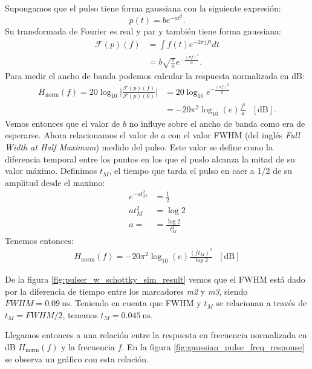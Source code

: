 Supongamos que el pulso tiene forma gaussiana con la siguiente expresión:
\begin{equation}
\label{eq:gaussian_pulse}
p(t) = b e^{-a t^2}.
\end{equation}
Su transformada de Fourier es real y par y también tiene forma gaussiana:
\begin{align}
    \mathcal{F}(p)(f) &= \int f(t) e^{-2\pi j f t} dt\\
    &= b\sqrt{\frac{\pi}{a}} e^{-\frac{(\pi f)^2}{a}}.
\end{align}
Para medir el ancho de banda podemos calcular la respuesta normalizada en dB:
\begin{align}
    H_{\text{norm}}(f) = 20 \log_{10} \bigg| \frac{\mathcal{F}(p)(f)}{\mathcal{F}(p)(0)}\bigg|  & = 20 \log_{10} e^{-\frac{(\pi f)^2}{a}}\\
 &= -20 \pi^2 \log_{10}(e) \frac{f^2}{a} \ \ \ [\text{dB}].
\end{align}
Vemos entonces que el valor de $b$ no influye sobre el ancho de banda como era
de esperarse. Ahora relacionamos el valor de $a$ con el valor FWHM (del inglés
\textit{Full Width at Half Maximum}) medido del pulso. Este valor se define como
la diferencia temporal entre los puntos en los que el puslo alcanza la mitad de
su valor máximo. Definimos $t_M$, el tiempo que tarda el pulso en caer a 1/2 de
su amplitud desde el maximo:
\begin{align}
    e^{-a t_M^2} &= \frac{1}{2}\\
    a t_M^2 &= \log 2 \\
    a = &= \frac{\log 2}{t_M^2}
    \label{eq:gaussian_a_expression}
\end{align}
Tenemos entonces:
\begin{align}
    H_{\text{norm}}(f) = -20 \pi^2 \log_{10}(e) \frac{(f t_M)^2}{\log 2} \ \ \ [\text{dB}]
\end{align}

De la figura \ref{fig:pulser_w_schottky_sim_result} vemos que el FWHM está dado
por la diferencia de tiempo entre los marcadores \textit{m2} y \textit{m3},
siendo $FWHM= \qty{0.09}{\nano\second}$. Teniendo en cuenta que FWHM y $t_M$ se
relacionan a través de $t_M=FWHM/2$, tenemos $t_M=\qty{0.045}{\nano\second}$.

Llegamos entonces a una relación entre la respuesta en frecuencia normalizada en
dB $H_{\text{norm}}(f)$ y la frecuencia $f$. En la figura
\ref{fig:gaussian_pulse_freq_response} se observa un gráfico con esta relación.

